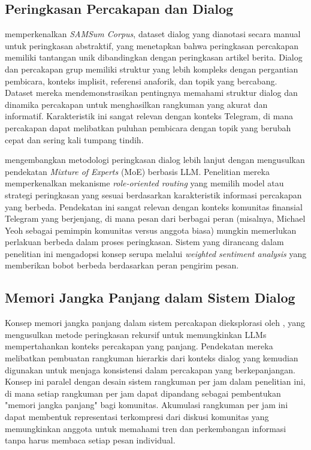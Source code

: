\subsection{Peringkasan Percakapan dan Dialog}

\textcite{gliwa2019} memperkenalkan \textit{SAMSum Corpus}, dataset dialog yang dianotasi secara manual untuk peringkasan abstraktif, yang menetapkan bahwa peringkasan percakapan memiliki tantangan unik dibandingkan dengan peringkasan artikel berita. Dialog dan percakapan grup memiliki struktur yang lebih kompleks dengan pergantian pembicara, konteks implisit, referensi anaforik, dan topik yang bercabang. Dataset mereka mendemonstrasikan pentingnya memahami struktur dialog dan dinamika percakapan untuk menghasilkan rangkuman yang akurat dan informatif. Karakteristik ini sangat relevan dengan konteks Telegram, di mana percakapan dapat melibatkan puluhan pembicara dengan topik yang berubah cepat dan sering kali tumpang tindih.

\textcite{tian2024} mengembangkan metodologi peringkasan dialog lebih lanjut dengan mengusulkan pendekatan \textit{Mixture of Experts} (MoE) berbasis LLM. Penelitian mereka memperkenalkan mekanisme \textit{role-oriented routing} yang memilih model atau strategi peringkasan yang sesuai berdasarkan karakteristik informasi percakapan yang berbeda. Pendekatan ini sangat relevan dengan konteks komunitas finansial Telegram yang berjenjang, di mana pesan dari berbagai peran (misalnya, Michael Yeoh sebagai pemimpin komunitas versus anggota biasa) mungkin memerlukan perlakuan berbeda dalam proses peringkasan. Sistem yang dirancang dalam penelitian ini mengadopsi konsep serupa melalui \textit{weighted sentiment analysis} yang memberikan bobot berbeda berdasarkan peran pengirim pesan.

\subsection{Memori Jangka Panjang dalam Sistem Dialog}

Konsep memori jangka panjang dalam sistem percakapan dieksplorasi oleh \textcite{wang2023recursive}, yang mengusulkan metode peringkasan rekursif untuk memungkinkan LLMs mempertahankan konteks percakapan yang panjang. Pendekatan mereka melibatkan pembuatan rangkuman hierarkis dari konteks dialog yang kemudian digunakan untuk menjaga konsistensi dalam percakapan yang berkepanjangan. Konsep ini paralel dengan desain sistem rangkuman per jam dalam penelitian ini, di mana setiap rangkuman per jam dapat dipandang sebagai pembentukan "memori jangka panjang" bagi komunitas. Akumulasi rangkuman per jam ini dapat membentuk representasi terkompresi dari diskusi komunitas yang memungkinkan anggota untuk memahami tren dan perkembangan informasi tanpa harus membaca setiap pesan individual.

